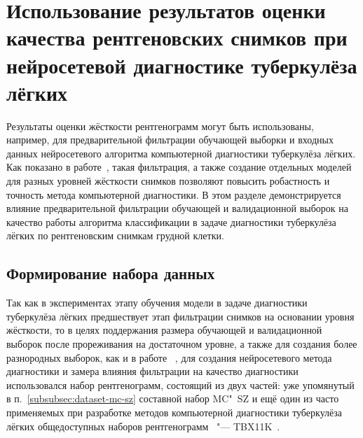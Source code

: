 \section{Использование результатов оценки качества рентгеновских снимков при нейросетевой диагностике туберкулёза лёгких}

Результаты оценки жёсткости рентгенограмм могут быть использованы, например, для предварительной фильтрации обучающей выборки и входных данных нейросетевого алгоритма компьютерной диагностики туберкулёза лёгких. Как показано в работе~\cite{dovganich2022automatic}, такая фильтрация, а также создание отдельных моделей для разных уровней жёсткости снимков позволяют повысить робастность и точность метода компьютерной диагностики. В этом разделе демонстрируется влияние предварительной фильтрации обучающей и валидационной выборок на качество работы алгоритма классификации в задаче диагностики туберкулёза лёгких по рентгеновским снимкам грудной клетки.

\subsection{Формирование набора данных} \label{subsubsec:dataset-tbx}

Так как в экспериментах этапу обучения модели в задаче диагностики туберкулёза лёгких предшествует этап фильтрации снимков на основании уровня жёсткости, то в целях поддержания размера обучающей и валидационной выборок после прореживания на достаточном уровне, а также для создания более разнородных выборок, как и в работе ~\cite{dovganich2022automatic}, для создания нейросетевого метода диагностики и замера влияния фильтрации на качество диагностики использовался набор рентгенограмм, состоящий из двух частей: уже упомянутый в п.~\ref{subsubsec:dataset-mc-sz} составной набор MC"~SZ и ещё один из часто применяемых при разработке методов компьютерной диагностики туберкулёза лёгких общедоступных наборов рентгенограмм~\cite{singh2022evolution, santosh2022advances} "--- TBX11K~\cite{liu2020rethinking}.


